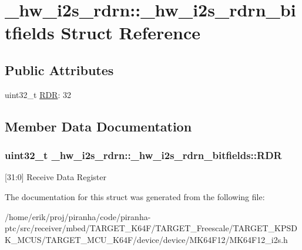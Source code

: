 \hypertarget{struct__hw__i2s__rdrn_1_1__hw__i2s__rdrn__bitfields}{}\section{\+\_\+hw\+\_\+i2s\+\_\+rdrn\+:\+:\+\_\+hw\+\_\+i2s\+\_\+rdrn\+\_\+bitfields Struct Reference}
\label{struct__hw__i2s__rdrn_1_1__hw__i2s__rdrn__bitfields}
\subsection*{Public Attributes}
\begin{DoxyCompactItemize}
\item 
uint32\+\_\+t \hyperlink{struct__hw__i2s__rdrn_1_1__hw__i2s__rdrn__bitfields_ac88d8970d8307b58e1ea257eea9ae779}{R\+DR}\+: 32
\end{DoxyCompactItemize}


\subsection{Member Data Documentation}
\subsubsection[{\texorpdfstring{R\+DR}{RDR}}]{\setlength{\rightskip}{0pt plus 5cm}uint32\+\_\+t \+\_\+hw\+\_\+i2s\+\_\+rdrn\+::\+\_\+hw\+\_\+i2s\+\_\+rdrn\+\_\+bitfields\+::\+R\+DR}\hypertarget{struct__hw__i2s__rdrn_1_1__hw__i2s__rdrn__bitfields_ac88d8970d8307b58e1ea257eea9ae779}{}\label{struct__hw__i2s__rdrn_1_1__hw__i2s__rdrn__bitfields_ac88d8970d8307b58e1ea257eea9ae779}
\mbox{[}31\+:0\mbox{]} Receive Data Register 

The documentation for this struct was generated from the following file\+:\begin{DoxyCompactItemize}
\item 
/home/erik/proj/piranha/code/piranha-\/ptc/src/receiver/mbed/\+T\+A\+R\+G\+E\+T\+\_\+\+K64\+F/\+T\+A\+R\+G\+E\+T\+\_\+\+Freescale/\+T\+A\+R\+G\+E\+T\+\_\+\+K\+P\+S\+D\+K\+\_\+\+M\+C\+U\+S/\+T\+A\+R\+G\+E\+T\+\_\+\+M\+C\+U\+\_\+\+K64\+F/device/device/\+M\+K64\+F12/M\+K64\+F12\+\_\+i2s.\+h\end{DoxyCompactItemize}
